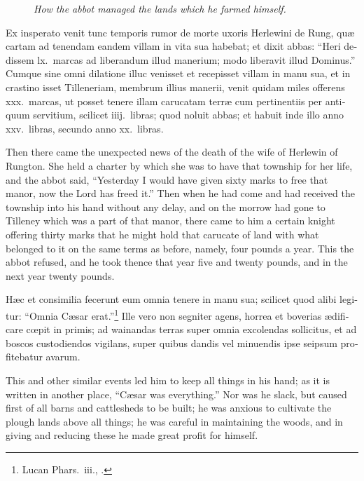 \documentclass[10pt]{book}
\newcommand{\blockhead}[4][]{
\begin{figure}
\centering
\vspace{#4}
\parbox{2.75cm}{\begin{center}\footnotesize \color{BrickRed} \emph{#2}\\ #1 \end{center}}
\end{figure}
}
\begin{document}
\begin{paracol}{2}
\switchcolumn*

\begin{otherlanguage}{latin}
\blockhead{How the abbot managed the lands which he farmed himself.}{4}{-0.45cm}
Ex insperato venit tunc temporis rumor de morte uxoris Herlewini de Rung, qu\ae{} cartam ad tenendam eandem villam in vita sua habebat; et dixit abbas: ``Heri dedissem lx.\ marcas ad liberandum illud manerium; modo liberavit illud Dominus.'' Cumque sine omni dilatione illuc venisset et recepisset villam in manu sua, et in crastino isset Tilleneriam, membrum illius manerii, venit quidam miles offerens xxx.\ marcas, ut posset tenere illam carucatam terr\ae{} cum pertinentiis per antiquum servitium, scilicet iiij.\ libras; quod noluit abbas; et habuit inde illo anno xxv.\ libras, secundo anno xx.\ libras.

\end{otherlanguage}

\switchcolumn

Then there came the unexpected news of the death of the wife of Herlewin of Rungton. She held a charter by which she was to have that township for her life, and the abbot said, ``Yesterday I would have given sixty marks to free that manor, now the Lord has freed it.'' Then when he had come and had received the township into his hand without any delay, and on the morrow had gone to Tilleney which was a part of that manor, there came to him a certain knight offering thirty marks that he might hold that carucate of land with what belonged to it on the same terms as before, namely, four pounds a year. This the abbot refused, and he took thence that year five and twenty pounds, and in the next year twenty pounds.

\switchcolumn*

\begin{otherlanguage}{latin}
H\ae{}c et consimilia fecerunt eum omnia tenere in manu sua; scilicet quod alibi legitur: ``Omnia C\ae{}sar erat.''\footnote[\textdagger]{Lucan Phars.\ iii., .} Ille vero non segniter agens, horrea et boverias \ae{}dificare c\oe{}pit in primis; ad wainandas terras super omnia excolendas sollicitus, et ad boscos custodiendos vigilans, super quibus dandis vel minuendis ipse seipsum profitebatur avarum.
\end{otherlanguage}

\switchcolumn

This and other similar events led him to keep all things in his hand; as it is written in another place, ``C\ae{}sar was everything.'' Nor was he slack, but caused first of all barns and cattlesheds to be built; he was anxious to cultivate the plough lands above all things; he was careful in maintaining the woods, and in giving and reducing these he made great profit for himself.


\end{paracol}
\end{document}
